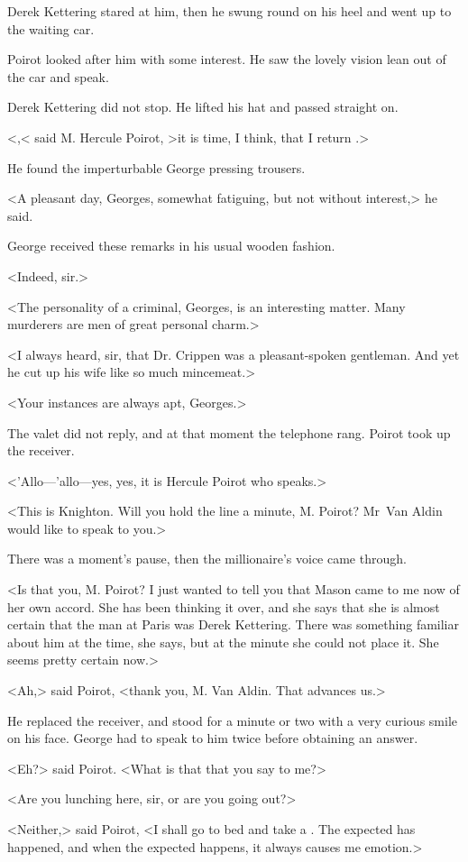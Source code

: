 Derek Kettering stared at him, then he swung round on his heel and went up to the waiting car.

Poirot looked after him with some interest. He saw the lovely vision lean out of the car and speak.

Derek Kettering did not stop. He lifted his hat and passed straight on.

<,< said M. Hercule Poirot, >it is time, I think, that I return .>

He found the imperturbable George pressing trousers.

<A pleasant day, Georges, somewhat fatiguing, but not without interest,> he said.

George received these remarks in his usual wooden fashion.

<Indeed, sir.>

<The personality of a criminal, Georges, is an interesting matter. Many murderers are men of great personal charm.>

<I always heard, sir, that Dr. Crippen was a pleasant-spoken gentleman. And yet he cut up his wife like so much mincemeat.>

<Your instances are always apt, Georges.>

The valet did not reply, and at that moment the telephone rang. Poirot took up the receiver.

<'Allo—'allo—yes, yes, it is Hercule Poirot who speaks.>

<This is Knighton. Will you hold the line a minute, M. Poirot? Mr~Van Aldin would like to speak to you.>

There was a moment's pause, then the millionaire's voice came through.

<Is that you, M. Poirot? I just wanted to tell you that Mason came to me now of her own accord. She has been thinking it over, and she says that she is almost certain that the man at Paris was Derek Kettering. There was something familiar about him at the time, she says, but at the minute she could not place it. She seems pretty certain now.>

<Ah,> said Poirot, <thank you, M. Van Aldin. That advances us.>

He replaced the receiver, and stood for a minute or two with a very curious smile on his face. George had to speak to him twice before obtaining an answer.

<Eh?> said Poirot. <What is that that you say to me?>

<Are you lunching here, sir, or are you going out?>

<Neither,> said Poirot, <I shall go to bed and take a . The expected has happened, and when the expected happens, it always causes me emotion.>